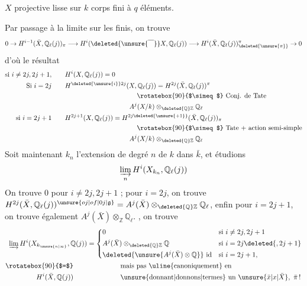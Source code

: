 $X$ projective lisse  sur $k$ corps fini à $q$ éléments. %

Par passage à la limite sur les   finis, on %
trouve %
\[
0\to H^{i-1}(\bar X,\mathbb{Q}_{\ell}(j))_{\pi}
\longrightarrow H^i(\deleted{\unsure{\overline{\phantom X}}}X,\mathbb{Q}_{\ell}(j))
\longrightarrow H^i(\bar X,\mathbb{Q}_{\ell}(j))_{\deleted{\unsure{\pi}}}^{\pi}\to 0 %
\]
d'où le résultat %
\[
\begin{aligned}
\text{si } i\ne2j,2j+1,\qquad & H^i(X,\mathbb{Q}_{\ell}(j))=0\\ %
\text{Si } i=2j\qquad & H^{\deleted{\unsure{i}}2j}(X,\mathbb{Q}_{\ell}(j))
 = H^{2j}(\bar X,\mathbb{Q}_{\ell}(j))^{\pi}\\ %
&\hspace{38mm}\rotatebox{90}{$\simeq$}\ \text{Conj. de Tate}\\ %
&\hspace{34mm} A^j(X/k)\otimes_{\deleted{\mathbb{Q}}\mathbb{Z}}\mathbb{Q}_{\ell}\\ %
\text{si } i=2j+1\qquad & H^{2j+1}(X,\mathbb{Q}_{\ell}(j))
 =H^{2j\deleted{\unsure{+1}}}(\bar X,\mathbb{Q}_{\ell}(j))_{\pi}\\ %
&\hspace{38mm}\rotatebox{90}{$\simeq$}\ \text{Tate + action semi-simple}\\ %
&\hspace{34mm} A^j(X/k)\otimes_{\deleted{\mathbb{Q}}\mathbb{Z}}\mathbb{Q}_{\ell}
\end{aligned} %
\]
Soit maintenant $k_n$ l'extension de degré %
$n$ de $k$ dans $\bar k$, et étudions %
\[
\varinjlim_n H^i(X_{k_n},\mathbb{Q}_\ell(j)) %
\]
On trouve $0$ pour $i\ne2j,2j+1$ ; pour %
$i=2j$, on trouve $H^{2j}(\bar X,\mathbb{Q}_{\ell}(j))^{\unsure{oj|of|0j|\mathfrak{g}}}=A^j(\bar X)\otimes_{\deleted{\mathbb{Q}}\mathbb{Z}}\mathbb{Q}_{\ell}$, %
enfin pour $i=2j+1$, on trouve également %
$A^j(\bar X)\otimes_{\mathbb{Z}}\mathbb{Q}_{\ell}$.  , on trouve  %
\[
\begin{aligned}
\varinjlim H^i(X_{k_{\unsure{n|\infty}}},\mathbb{Q}(j))
&=\left\{\begin{aligned}
&0 &&\text{si }i\ne2j,2j+1\\ %
&A^j(\bar X)\otimes_{\deleted{\mathbb{Q}}\mathbb{Z}}\mathbb{Q}&&\text{si }i=2j\deleted{,2j+1}\\ %
&\deleted{\unsure{A^j(\bar X)\otimes\mathbb{Q}}}\ \text{id}&&\text{si }i=2j+1,
\end{aligned}\right.\\ %
\rotatebox{90}{$=$}\qquad&\hspace{17mm}\text{mais pas \uline{canoniquement} en}\\ %
H^i(\bar X,\mathbb{Q}(j))\qquad&\hspace{17mm}\text{\unsure{donnant|donnons|termes} un }\unsure{\bar x|x|\bar X},\ \bar\pi\,!
\end{aligned} %
\]

